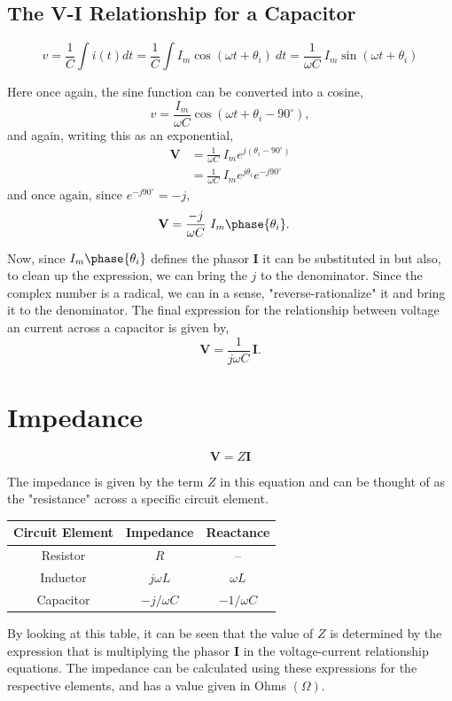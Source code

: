 \documentclass[12pt]{article}
\begin{document}
    \subsection*{The V-I Relationship for a Capacitor}
    \[
        v = \frac{1}{C} \int i(t) dt = \frac{1}{C} \int I_m \cos (\omega t +
        \theta_i)\ dt = \frac{1}{\omega C}\ I_m \sin (\omega t + \theta_i)
    \]
    \par Here once again, the sine function can be converted into a cosine,
    \[
        v = \frac{I_m}{\omega C} \cos (\omega t + \theta_i - 90^{\circ})
    ,\]
    and again, writing this as an exponential,
    \begin{align*}
        \textbf{V} &= \frac{1}{\omega C}\ I_m e^{j (\theta_i - 90^{\circ})} \\
                   &= \frac{1}{\omega C}\ I_m e^{j \theta_i} e^{-j 90^{\circ}}
    \end{align*}
    and once again, since $e^{-j 90^{\circ}} = -j$,
    \begin{align*}
        \textbf{V} &= \frac{-j}{\omega C}\ I_m \phase{\theta_i}.
    \end{align*}
    \par Now, since $I_m \phase{\theta_i}$ defines the phasor $\textbf{I}$ it
    can be substituted in but also, to clean up the expression, we can bring the
    $j$ to the denominator. Since the complex number is a radical, we can in a
    sense, "reverse-rationalize" it and bring it to the denominator. The final
    expression for the relationship between voltage an current across a
    capacitor is given by,
    \[
        \textbf{V} = \frac{1}{j \omega C}\, \textbf{I}.
    \]
    \section*{Impedance}
    \[
        \textbf{V} = Z \textbf{I}
    \]
    \par The impedance is given by the term $Z$ in this equation and can be
    thought of as the "resistance" across a specific circuit element.
    \begin{table}[h]
        \centering
        \begin{tabular}{ccc}
            \toprule
            Circuit Element & Impedance & Reactance \\
            \midrule
            Resistor & $R$ & -- \\
            Inductor & $j \omega L$ & $\omega L$ \\
            Capacitor & $-j / \omega C$ & $-1 / \omega C$ \\
            \bottomrule
        \end{tabular}
    \end{table}
    \par By looking at this table, it can be seen that the value of $Z$ is
    determined by the expression that is multiplying the phasor $\textbf{I}$ in
    the voltage-current relationship equations. The impedance can be calculated
    using these expressions for the respective elements, and has a value given
    in Ohms $(\Omega)$.
\end{document}
